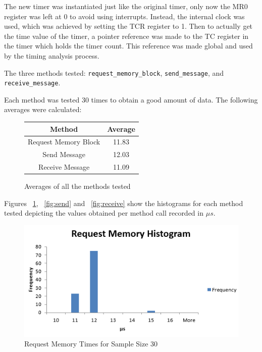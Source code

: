 \documentclass[se]{uw-wkrpt}
\begin{document}
The new timer was instantiated just like the original timer, only now the MR0 register was left at 0 to avoid using interrupts. Instead, the internal clock was used, which was achieved by setting the TCR register to 1. Then to actually get the time value of the timer, a pointer reference was made to the TC register in the timer which holds the timer count. This reference was made global and used by the timing analysis process. 

The three methods tested: \texttt{request\_memory\_block}, \texttt{send\_message}, and \texttt{receive\_message}. 

Each method was tested 30 times to obtain a good amount of data. 
The following averages were calculated:
\begin{figure}
\begin{center}
\begin{tabular}{|c|c|}
\hline
Method & Average\\
\hline
Request Memory Block & 11.83 \\
\hline
Send Message & 12.03 \\
\hline
Receive Message & 11.09\\
\hline
\end{tabular}
\end{center}
\caption{Averages of all the methods tested}
\end{figure}

Figures ~\ref{fig:mem}, ~\ref{fig:send} and ~\ref{fig:receive} show the histograms for each method tested depicting the values obtained per method call recorded in $\mu s$.

\begin{figure}[bp!]
\centering
\includegraphics[width=120mm]{RequestMemoryHistogram.PNG}
\caption{Request Memory Times for Sample Size 30}
\label{fig:mem}
\end{figure}
\end{document}
